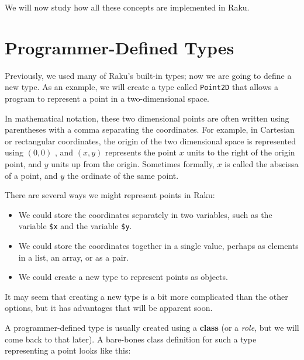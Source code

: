 We will now study how all these concepts are implemented in Raku.


\section{Programmer-Defined Types}
\label{point}

Previously, we used many of Raku's built-in types; now we are going
to define a new type.  As an example, we will create a type
called {\tt Point2D} that allows a program to represent a point in a two-dimensional space.

In mathematical notation, these two dimensional points are often written using
parentheses with a comma separating the coordinates. For example, 
in Cartesian or rectangular coordinates, the origin of the two dimensional
space is represented using $(0,0)$ , and $(x,y)$ represents the point $x$ units to the 
right of the origin point, and $y$ units up from the origin. Sometimes formally, $x$ is called 
the abscissa of a point, and $y$ the ordinate of the same point.

There are several ways we might represent points in Raku:

\begin{itemize}

\item We could store the coordinates separately in two
variables, such as the variable {\tt \$x} and the variable {\tt \$y}.

\item We could store the coordinates together in a single value, perhaps 
as elements in a list, an array, or as a pair.

\item We could create a new type to represent points as
objects.

\end{itemize}

It may seem that creating a new type is a bit more complicated than the 
other options, but it has advantages that will be apparent soon.

A programmer-defined type is usually created using a {\bf class}
(or a \emph{role}, but we will come back to that later). 
A bare-bones class definition for such a type representing a point looks like this:

